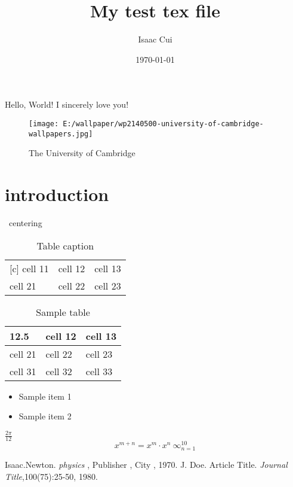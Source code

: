 \documentclass[a4paper,13pt]{book}
\begin{document}
\title{My test tex file}
\author{Isaac Cui }
\date{\today}
%
\maketitle
	Hello, World!
	I sincerely love you! 

\begin{figure}[H]
\centering
\texttt{[image: E:/wallpaper/wp2140500-university-of-cambridge-wallpapers.jpg]}
\caption{The University of Cambridge}
\label{figure1}                                                                                                                                                                                                                                                                                                                                                                                                                                                                                                   
\end{figure}

\section{introduction}
\begin{table} [!ht]
\ centering
	\begin{tabular}{ l l l }[c]
 		 cell 11 & cell 12 & cell 13 \\
		 cell 21 & cell 22 & cell 23 \\
 	\end{tabular}
 \caption{Table caption}
 \label { tab:myspstable}
 \end{table}

\begin{table} [ ht ]
 \centering
 \begin{tabular}{p{2cm} |p{3cm}p{3cm} }
 12.5 & cell 12 & cell 13 \\ \hline
 cell 21 & cell 22 & cell 23 \\
 cell 31 & cell 32 & cell 33
 \end{tabular}
 \caption{Sample table }
 \label { tab:myspstable1}
 \end{table}

\begin{itemize}
 \item Sample item 1
 \item Sample item 2
\end{itemize}



$\frac{2\pi}{12}$
$$ x^{m+n} = x^m \cdot x^n \ \infty_{n=1}^{10}$$


\begin{thebibliography}{99}
	 Isaac.Newton. \emph{physics} , Publisher , City , 1970.
	 J. Doe. Article Title.  \emph{Journal Title},100(75):25-50, 1980. 
\end{thebibliography}
\end{document}
